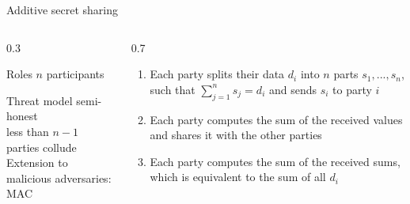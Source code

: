 \documentclass[t,aspectratio=169]{beamer}
\begin{document}
\begin{frame}{Additive secret sharing \cite{geeksforgeeks_smpc}}
\begin{columns}
    \begin{column} {0.3\textwidth}
    \begin{alertblock} {Roles}
        $n$ participants
    \end{alertblock}
        \begin{alertblock} {Threat model}
            semi-honest \\ less than $n-1$ parties collude \\
            Extension to malicious adversaries: MAC
        \end{alertblock}
    \end{column}
    \begin{column} {0.7\textwidth}

        \begin{enumerate}
            \item Each party splits their data $d_i$ into $n$ parts $s_1,...,s_n$, such that $\sum_{j=1}^ns_j=d_i$ and sends $s_i$ to party $i$
            \item Each party computes the sum of the received values and shares it with the other parties
            \item Each party computes the sum of the received sums, which is equivalent to the sum of all $d_i$
        \end{enumerate}
        \end{column}
    \end{columns}
\end{frame}
\end{document}
